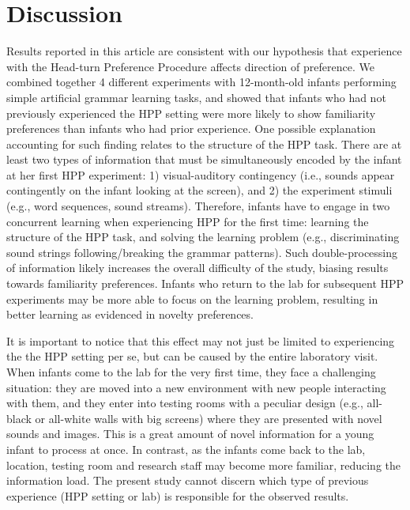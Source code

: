 \documentclass[english,man]{apa6}
\begin{document}
\hypertarget{discussion}{%
\section{Discussion}\label{discussion}}

Results reported in this article are consistent with our hypothesis that experience with the Head-turn Preference Procedure affects direction of preference. We combined together 4 different experiments with 12-month-old infants performing simple artificial grammar learning tasks, and showed that infants who had not previously experienced the HPP setting were more likely to show familiarity preferences than infants who had prior experience. One possible explanation accounting for such finding relates to the structure of the HPP task. There are at least two types of information that must be simultaneously encoded by the infant at her first HPP experiment: 1) visual-auditory contingency (i.e., sounds appear contingently on the infant looking at the screen), and 2) the experiment stimuli (e.g., word sequences, sound streams). Therefore, infants have to engage in two concurrent learning when experiencing HPP for the first time: learning the structure of the HPP task, and solving the learning problem (e.g., discriminating sound strings following/breaking the grammar patterns). Such double-processing of information likely increases the overall difficulty of the study, biasing results towards familiarity preferences. Infants who return to the lab for subsequent HPP experiments may be more able to focus on the learning problem, resulting in better learning as evidenced in novelty preferences.

It is important to notice that this effect may not just be limited to experiencing the the HPP setting per se, but can be caused by the entire laboratory visit. When infants come to the lab for the very first time, they face a challenging situation: they are moved into a new environment with new people interacting with them, and they enter into testing rooms with a peculiar design (e.g., all-black or all-white walls with big screens) where they are presented with novel sounds and images. This is a great amount of novel information for a young infant to process at once. In contrast, as the infants come back to the lab, location, testing room and research staff may become more familiar, reducing the information load. The present study cannot discern which type of previous experience (HPP setting or lab) is responsible for the observed results.
\end{document}
